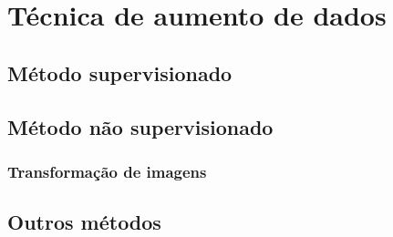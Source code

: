 \section{Técnica de aumento de dados}

\subsection{Método supervisionado}

\subsection{Método não supervisionado}

\subsubsection{Transformação de imagens}

\subsection{Outros métodos}